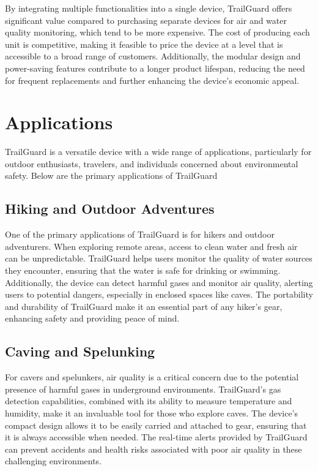 \documentclass[a4paper,11pt]{article}%
\begin{document}
By integrating multiple functionalities into a single device, TrailGuard offers significant value compared to purchasing separate devices for air and water quality monitoring, which tend to be more expensive. The cost of producing each unit is competitive, making it feasible to price the device at a level that is accessible to a broad range of customers. Additionally, the modular design and power-saving features contribute to a longer product lifespan, reducing the need for frequent replacements and further enhancing the device's economic appeal.






\newpage
\section{Applications}
TrailGuard is a versatile device with a wide range of applications, particularly for outdoor enthusiasts, travelers, and individuals concerned about environmental safety. Below are the primary applications of TrailGuard
\subsection{Hiking and Outdoor Adventures}
One of the primary applications of TrailGuard is for hikers and outdoor adventurers. When exploring remote areas, access to clean water and fresh air can be unpredictable. TrailGuard helps users monitor the quality of water sources they encounter, ensuring that the water is safe for drinking or swimming. Additionally, the device can detect harmful gases and monitor air quality, alerting users to potential dangers, especially in enclosed spaces like caves. The portability and durability of TrailGuard make it an essential part of any hiker's gear, enhancing safety and providing peace of mind.

\subsection{Caving and Spelunking}
For cavers and spelunkers, air quality is a critical concern due to the potential presence of harmful gases in underground environments. TrailGuard’s gas detection capabilities, combined with its ability to measure temperature and humidity, make it an invaluable tool for those who explore caves. The device's compact design allows it to be easily carried and attached to gear, ensuring that it is always accessible when needed. The real-time alerts provided by TrailGuard can prevent accidents and health risks associated with poor air quality in these challenging environments.
\end{document}
